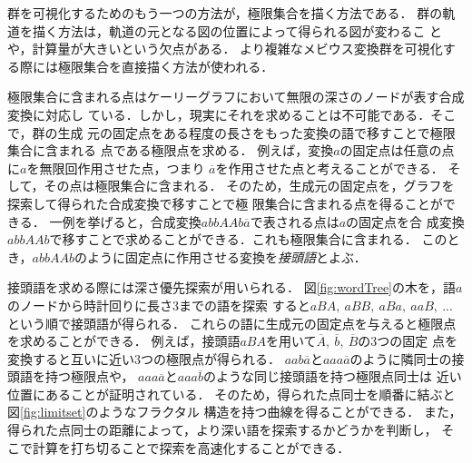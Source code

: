 群を可視化するためのもう一つの方法が，極限集合を描く方法である．
群の軌道を描く方法は，軌道の元となる図の位置によって得られる図が変わるこ
とや，計算量が大きいという欠点がある．
より複雑なメビウス変換群を可視化する際には極限集合を直接描く方法が使われる．

極限集合に含まれる点はケーリーグラフにおいて無限の深さのノードが表す合成変換に対応し
ている．しかし，現実にそれを求めることは不可能である．そこで，群の生成
元の固定点をある程度の長さをもった変換の語で移すことで極限集合に含まれる
点である極限点を求める．
例えば，変換$a$の固定点は任意の点に$a$を無限回作用させた点，つまり
$\overline{a}$を作用させた点と考えることができる．
そして，その点は極限集合に含まれる．
そのため，生成元の固定点を，グラフを探索して得られた合成変換で移すことで極
限集合に含まれる点を得ることができる．
一例を挙げると，合成変換$abbAAb\overline{a}$で表される点は$a$の固定点を合
成変換$abbAAb$で移すことで求めることができる．これも極限集合に含まれる．
このとき，$abbAAb$のように固定点に作用させる変換を\emph{接頭語}とよぶ．

接頭語を求める際には深さ優先探索が用いられる．
図\ref{fig:wordTree}の木を，語$a$のノードから時計回りに長さ3までの語を探索
すると$aBA,~aBB,~aBa,~aaB,~...$という順で接頭語が得られる．
これらの語に生成元の固定点を与えると極限点を求めることができる．
例えば，接頭語$aBA$を用いて$\overline{A},~\overline{b},~\overline{B}$の3つの固定
点を変換すると互いに近い3つの極限点が得られる．
$aab\overline{a}$と$aaa\overline{a}$のように隣同士の接頭語を持つ極限点や，
$aaa\overline{a}$と$aaa\overline{b}$のような同じ接頭語を持つ極限点同士は
近い位置にあることが証明されている．
そのため，得られた点同士を順番に結ぶと図\ref{fig:limitset}のようなフラクタル
構造を持つ曲線を得ることができる．
また，得られた点同士の距離によって，より深い語を探索するかどうかを判断し，
そこで計算を打ち切ることで探索を高速化することができる．

